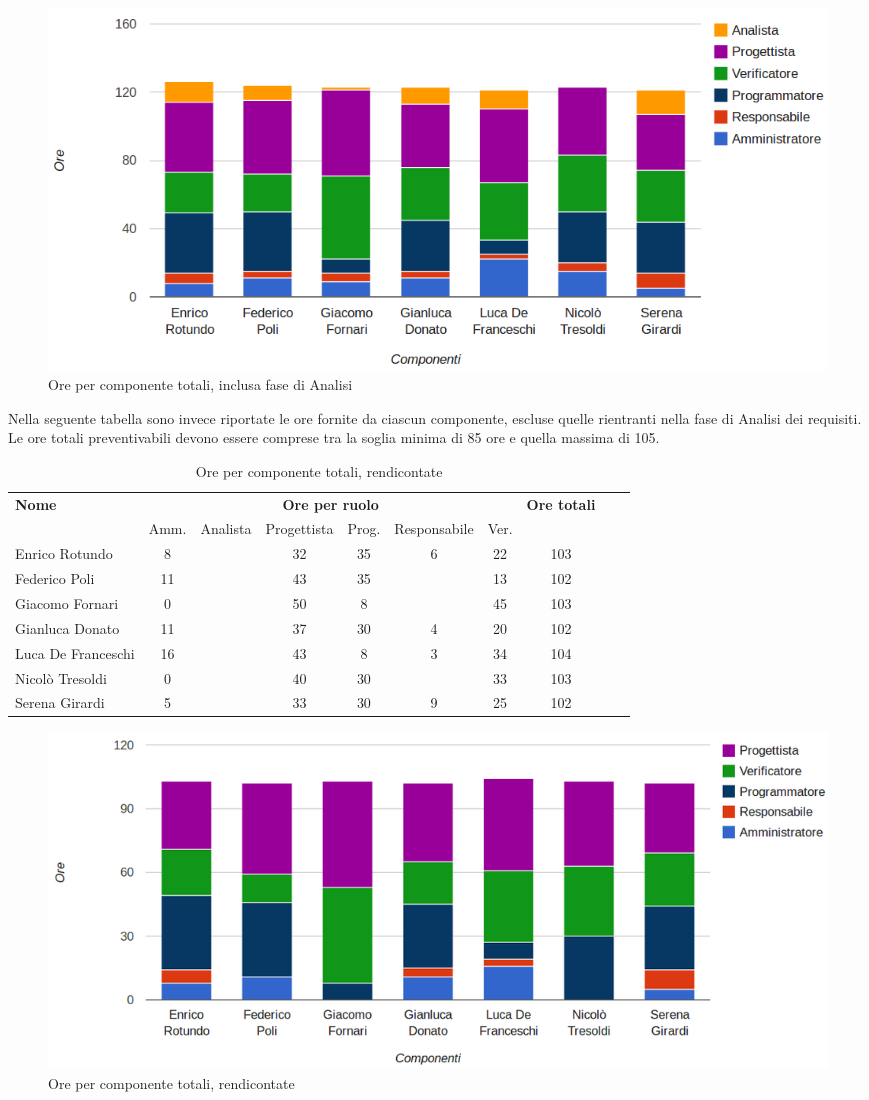 \begin{figure}[H]
\centering
\includegraphics[scale=0.35]{4-5-1.png}
\caption{Ore per componente totali, inclusa fase di Analisi\label{fig:nome}}
\end{figure}

Nella seguente tabella sono invece riportate le ore fornite da ciascun componente, escluse quelle rientranti nella fase di Analisi dei requisiti. 
Le ore totali preventivabili devono essere comprese tra la soglia minima di 85 ore e quella massima di 105.

\begin{table}[H]
\centering
\begin{tabular}{lccccccccc}
\toprule 
    \textbf{Nome}  & \multicolumn{6}{c}{\textbf{Ore per ruolo}} & \textbf{Ore totali}\\
    & Amm. & Analista & Progettista
    & Prog. & Responsabile & Ver. \\
    \midrule
    Enrico Rotundo   	& 8 & & 32 & 35 & 6 & 22 & 103 \\
    Federico Poli  		& 11	& & 43 & 35 &   & 13 & 102 \\
    Giacomo Fornari		& 0	& & 50 & 8  &   & 45 & 103 \\
    Gianluca Donato 		& 11	& & 37 & 30 & 4 & 20 & 102 \\
    Luca De Franceschi 	& 16	& & 43 & 8  & 3 & 34 & 104 \\
    Nicolò Tresoldi 		& 0	& & 40 & 30 &   & 33 & 103 \\
    Serena Girardi 		& 5	& & 33 & 30 & 9 & 25 & 102 \\
    
    \bottomrule
\end{tabular}
\caption{Ore per componente totali, rendicontate}
\end{table}

\begin{figure}[H]
\centering
\includegraphics[scale=0.35]{4-5-2.png}
\caption{Ore per componente totali, rendicontate\label{fig:nome}}
\end{figure}